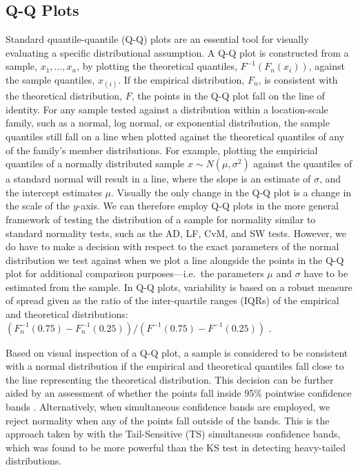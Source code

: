 \documentclass[12pt]{article}\usepackage[]{graphicx}\usepackage[]{color}
\begin{document}
\subsection{Q-Q Plots}

Standard quantile-quantile (Q-Q) plots \citep{Wilk:1968} are an essential tool for  visually evaluating a specific distributional assumption.  A Q-Q plot  is constructed from a sample, $x_1, \ldots, x_n$, by plotting the theoretical quantiles, $F^{-1}(F_n(x_i))$, against the sample quantiles, $x_{(i)}$. If the empirical distribution, $F_n$, is consistent with the theoretical distribution, $F$, the points in the Q-Q plot fall on the line of identity. 
For any sample tested against a distribution within a location-scale family, such as a normal, log normal, or exponential distribution, the sample quantiles still fall on a line when plotted against the theoretical quantiles of any of the family's member distributions. For example, plotting the empiricial quantiles of a normally distributed sample $x \sim N(\mu, \sigma^2)$ against the quantiles of a standard normal will result in a line, where  the slope is an estimate of $\sigma$, and the intercept estimates $\mu$. Visually  the only change in the Q-Q plot is a  change in the scale of the $y$-axis. We can therefore employ Q-Q plots in the more general framework of testing the distribution of a sample for normality similar to standard normality tests, such as the AD, LF, CvM, and SW tests. However, we do have to make a decision with respect to the exact parameters of the normal distribution we test against when we plot a line alongside the points in the Q-Q plot for additional comparison purposes---i.e.~the parameters $\mu$ and $\sigma$ have to be estimated from the sample. In Q-Q plots, variability is based on a robust measure of spread given as the ratio of the inter-quartile ranges (IQRs) of the empirical and theoretical distributions: $\left(F^{-1}_n(0.75) - F^{-1}_n(0.25)\right) / \left(F^{-1}(0.75) - F^{-1}(0.25)\right)$ \citep{becker:s}. 


Based on visual inspection of a Q-Q plot, a
 sample is considered to be consistent with a normal distribution if the empirical and theoretical quantiles fall close to the line representing the theoretical distribution.  This decision can be further aided by an assessment of
 whether the points fall inside 95\%  pointwise confidence bands \citep[][p.~150--154]{Davison:1997}. Alternatively, when simultaneous confidence bands are employed, we reject normality when any of the points fall outside of the bands. This is the approach taken by \citet{buja:2013} with the Tail-Sensitive (TS) simultaneous confidence bands, which was found to be more powerful than the KS test in detecting heavy-tailed distributions.
\end{document}
